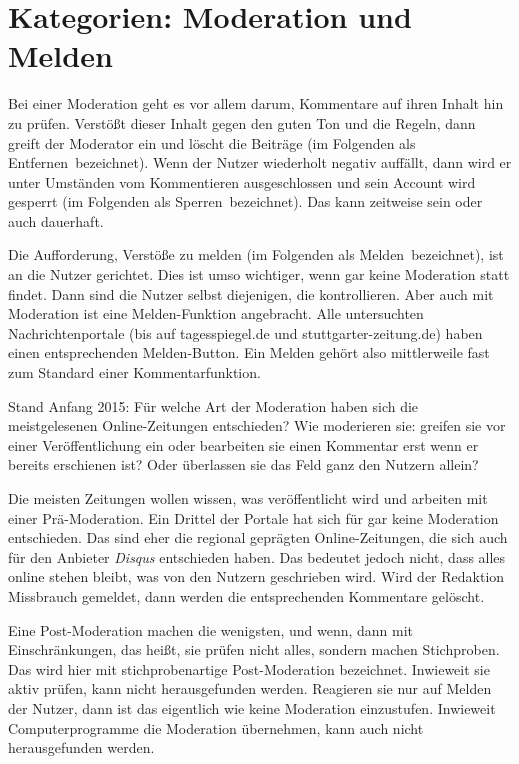 \section{Kategorien: \glqq Moderation\grqq\- und \glqq Melden\grqq}

Bei einer Moderation geht es vor allem darum, Kommentare auf ihren Inhalt hin zu
prüfen. Verstößt dieser Inhalt gegen den guten Ton und die Regeln, dann greift
der Moderator ein und löscht die Beiträge (im Folgenden als \glqq
Entfernen\grqq\ bezeichnet). Wenn der Nutzer wiederholt negativ auffällt, dann
wird er unter Umständen vom Kommentieren ausgeschlossen und sein Account wird
gesperrt (im Folgenden als  \glqq Sperren\grqq\ bezeichnet). Das kann zeitweise
sein oder auch dauerhaft.

Die Aufforderung, Verstöße zu melden (im Folgenden als \glqq Melden\grqq\
bezeichnet), ist an die Nutzer gerichtet. Dies ist umso wichtiger, wenn gar
keine Moderation statt findet. Dann sind die Nutzer selbst diejenigen, die
kontrollieren. Aber auch mit Moderation ist eine Melden-Funktion angebracht.
Alle  untersuchten Nachrichtenportale (bis auf tagesspiegel.de und stuttgarter-zeitung.de) haben einen
entsprechenden Melden-Button. Ein \glqq Melden\grqq\- gehört also 
mittlerweile fast zum Standard einer Kommentarfunktion. 

Stand Anfang 2015: Für welche Art der Moderation haben sich die meistgelesenen
Online-Zeitungen entschieden? Wie moderieren sie: greifen sie vor einer
Veröffentlichung ein oder bearbeiten sie einen Kommentar erst wenn er bereits
erschienen ist? Oder überlassen sie das Feld ganz den Nutzern allein?

Die meisten Zeitungen wollen wissen, was veröffentlicht wird und arbeiten mit
einer Prä-Moderation.  Ein Drittel der Portale hat sich für gar keine Moderation
entschieden. Das sind eher die regional geprägten Online-Zeitungen, die sich auch für
den Anbieter {\slshape Disqus} entschieden haben. Das bedeutet jedoch nicht,
dass alles online stehen bleibt, was von den Nutzern geschrieben wird.  Wird der
Redaktion Missbrauch gemeldet, dann werden die entsprechenden Kommentare
gelöscht.

Eine Post-Moderation machen die wenigsten, und wenn, dann mit Einschränkungen,
das heißt, sie prüfen nicht alles, sondern machen Stichproben. Das wird hier mit
\glqq stichprobenartige Post-Moderation\grqq{} bezeichnet. Inwieweit sie aktiv
prüfen, kann nicht herausgefunden werden. Reagieren sie nur auf Melden der
Nutzer, dann ist das eigentlich wie \glqq keine Moderation\grqq{} einzustufen.
Inwieweit Computerprogramme die Moderation übernehmen, kann auch nicht
herausgefunden werden.

